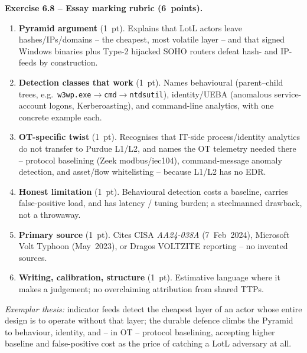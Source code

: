 \documentclass[11pt,a4paper]{article}
\begin{document}
\begin{solutionbox}
\textbf{Exercise 6.8 -- Essay marking rubric (6~points).}
\begin{enumerate}\setlength{\itemsep}{1pt}
  \item \textbf{Pyramid argument} (1~pt). Explains that LotL actors leave hashes/IPs/domains --
        the cheapest, most volatile layer -- and that signed Windows binaries plus Type-2
        hijacked SOHO routers defeat hash- and IP-feeds by construction.
  \item \textbf{Detection classes that work} (1~pt). Names behavioural (parent--child trees,
        e.g.\ \texttt{w3wp.exe}$\to$\texttt{cmd}$\to$\texttt{ntdsutil}), identity/UEBA
        (anomalous service-account logons, Kerberoasting), and command-line analytics, with one
        concrete example each.
  \item \textbf{OT-specific twist} (1~pt). Recognises that IT-side process/identity analytics do
        not transfer to Purdue L1/L2, and names the OT telemetry needed there -- protocol
        baselining (Zeek modbus/iec104), command-message anomaly detection, and asset/flow
        whitelisting -- because L1/L2 has no EDR.
  \item \textbf{Honest limitation} (1~pt). Behavioural detection costs a baseline, carries
        false-positive load, and has latency / tuning burden; a steelmanned drawback, not a
        throwaway.
  \item \textbf{Primary source} (1~pt). Cites CISA \emph{AA24-038A} (7~Feb~2024), Microsoft
        Volt Typhoon (May~2023), or Dragos VOLTZITE reporting -- no invented sources.
  \item \textbf{Writing, calibration, structure} (1~pt). Estimative language where it makes a
        judgement; no overclaiming attribution from shared TTPs.
\end{enumerate}
\emph{Exemplar thesis:} indicator feeds detect the cheapest layer of an actor whose entire
design is to operate without that layer; the durable defence climbs the Pyramid to behaviour,
identity, and -- in OT -- protocol baselining, accepting higher baseline and false-positive cost
as the price of catching a LotL adversary at all.
\end{solutionbox}
\end{document}
